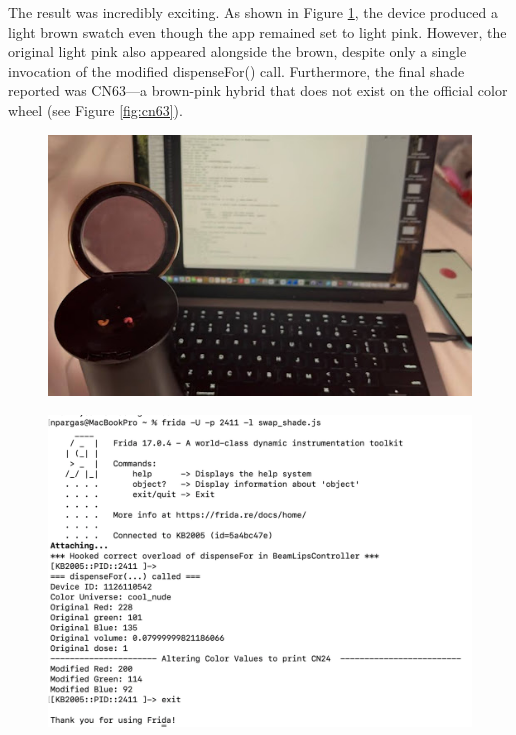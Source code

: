 The result was incredibly exciting. As shown in Figure \ref{fig:dispenseprint}, the device produced a light brown swatch even though the app remained set to light pink. However, the original light pink also appeared alongside the brown, despite only a single invocation of the modified dispenseFor() call. Furthermore, the final shade reported was CN63—a brown-pink hybrid that does not exist on the official color wheel (see Figure \ref{fig:cn63}).
\begin{figure}[H]
	\centering
	\includegraphics[scale=.7]{dispenseprint}
	\caption{}
	\label{fig:dispenseprint}
\end{figure}
\begin{figure}[H]
	\centering
	\includegraphics[scale=.15]{swapshadefrida}
	\caption{}
	\label{fig:swapshadefrida}
\end{figure}

